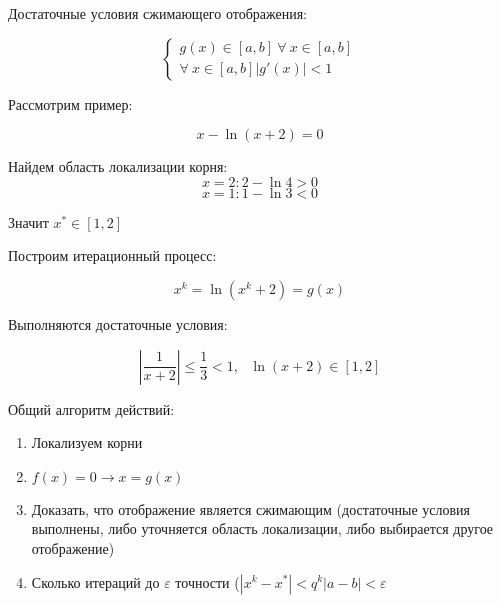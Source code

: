 \documentclass[10pt,a4paper]{article}
\begin{document}
	Достаточные условия сжимающего отображения:
	
	\begin{equation}
		\begin{cases}
			g\left(x\right) \in \left[a, b\right] \ \forall \ x \in 
			\left[a, b\right]
			\\
			\forall \ x \in \left[a, b\right] \left|g'\left(x\right)\right| < 1
		\end{cases}
	\end{equation}
	
	Рассмотрим пример:
	
	$$x - \ln\left(x + 2\right) = 0$$
	 
	Найдем область локализации корня:
	\begin{equation}
		x = 2: 2 - \ln 4 > 0
	\end{equation}
	\begin{equation}
		x = 1: 1 - \ln 3 < 0
	\end{equation}
	
	Значит $x^{*} \in \left[1, 2\right]$
	
	Построим итерационный процесс:
	
	\begin{equation}
		x^{k} = \ln\left(x^{k} + 2\right) = g\left(x\right)
	\end{equation}
	
	Выполняются достаточные условия:
	
	\begin{equation}
		\left|\frac{1}{x + 2}\right| \leqslant \frac{1}{3} < 1, \ \ \ \ln\left(
		x + 2\right)\in \left[1, 2\right]
	\end{equation}
	
	Общий алгоритм действий:
	
	\begin{enumerate}
		\item Локализуем корни
		\item $f\left(x\right) = 0 \rightarrow x = g\left(x\right)$
		\item Доказать, что отображение является сжимающим (достаточные условия 
		выполнены, либо уточняется область локализации, либо выбирается другое
		отображение)
		\item Сколько итераций до $\varepsilon$ точности ($\left|x^{k} - 
		x^{*}\right| < q^{k}\left|a - b\right| < \varepsilon$
	\end{enumerate}
	 
\end{document}

